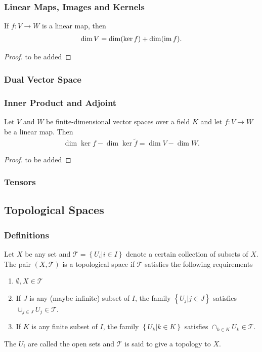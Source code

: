 \documentclass[10pt]{article}
\begin{document}
\subsubsection{Linear Maps, Images and Kernels}
\begin{theorem}
    If $f:V\to W$ is a linear map, then
    \begin{align}
        \dim{V}=\dim(\ker{f})+\dim(\operatorname{im} f).
    \end{align}
\end{theorem}
\begin{proof}
    to be added
\end{proof}

\subsubsection{Dual Vector Space}

\subsubsection{Inner Product and Adjoint}
\begin{theorem}
    Let $V$ and $W$ be finite-dimensional vector spaces over a field $K$ and let $f:V\to W$ be a linear map.
    Then
    \begin{align}
        \dim\ker f-\dim\ker\tilde{f}=\dim V-\dim W.
    \end{align}
\end{theorem}
\begin{proof}
    to be added
\end{proof}

\subsubsection{Tensors}

\subsection{Topological Spaces}
\subsubsection{Definitions}
\begin{definition}
    Let $X$ be any set and $\mathcal{T}=\left\{U_i\vert i\in I\right\}$ denote a certain collection of subsets of $X$.
    The pair $(X,\mathcal{T})$ is a topological space if $\mathcal{T}$ satisfies the following requirements
    \begin{enumerate}
        \item $\emptyset,X\in\mathcal{T}$
        \item If $J$ is any (maybe infinite) subset of $I$, the family $\left\{U_j\vert j\in J\right\}$ satisfies $\cup_{j\in J}U_j\in \mathcal{T}$.
        \item If $K$ is any finite subset of $I$, the family $\left\{U_k\vert k\in K\right\}$ satisfies $\cap_{k\in K}U_k\in\mathcal{T}$.
    \end{enumerate}
    The $U_i$ are called the open sets and $\mathcal{T}$ is said to give a topology to $X$.
\end{definition}
\end{document}
